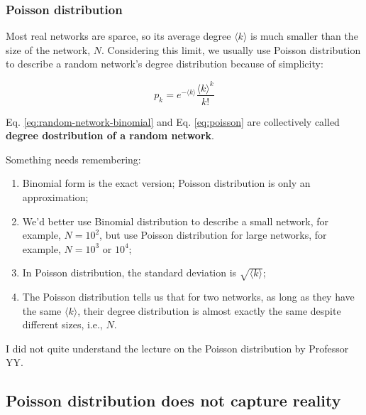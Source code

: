 \documentclass[
]{krantz}
\makeatletter
\newenvironment{kframe}{%
\medskip{}
\setlength{\fboxsep}{.8em}
 \def\at@end@of@kframe{}%
 \ifinner\ifhmode%
  \def\at@end@of@kframe{\end{minipage}}%
  \begin{minipage}{\columnwidth}%
 \fi\fi%
 \def\FrameCommand##1{\hskip\@totalleftmargin \hskip-\fboxsep
 \colorbox{shadecolor}{##1}\hskip-\fboxsep
     \hskip-\linewidth \hskip-\@totalleftmargin \hskip\columnwidth}%
 \MakeFramed {\advance\hsize-\width
   \@totalleftmargin\z@ \linewidth\hsize
   \@setminipage}}%
 {\par\unskip\endMakeFramed%
 \at@end@of@kframe}
\newenvironment{rmdblock}[1]
  {
  \begin{itemize}
  \renewcommand{\labelitemi}{
    \raisebox{-.7\height}[0pt][0pt]{
      {\setkeys{Gin}{width=3em,keepaspectratio}\texttt{[image: images/\#1]}}
    }
  }
  \setlength{\fboxsep}{1em}
  \begin{kframe}
  \item
  }
  {
  \end{kframe}
  \end{itemize}
  }
\newenvironment{rmdreminder}
  {\begin{rmdblock}{reminder}}
  {\end{rmdblock}}
\makeatother
\begin{document}
\hypertarget{poisson-distribution}{%
\subsubsection{Poisson distribution}\label{poisson-distribution}}

Most real networks are sparce, so its average degree \(\langle k \rangle\) is much smaller than the size of the network, \(N\). Considering this limit, we usually use Poisson distribution to describe a random network's degree distribution because of simplicity:

\begin{equation}
  p_k = e^{-\langle k \rangle}\frac{\langle k \rangle^k}{k!} \label{eq:poisson}
\end{equation}

Eq. \eqref{eq:random-network-binomial} and Eq. \eqref{eq:poisson} are collectively called \textbf{degree dostribution of a random network}.

Something needs remembering:

\begin{enumerate}
\def\labelenumi{\arabic{enumi}.}
\item
  Binomial form is the exact version; Poisson distribution is only an approximation;
\item
  We'd better use Binomial distribution to describe a small network, for example, \(N = 10^2\), but use Poisson distribution for large networks, for example, \(N = 10^3\) or \(10^4\);
\item
  In Poisson distribution, the standard deviation is \(\sqrt {\langle k \rangle}\);
\item
  The Poisson distribution tells us that for two networks, as long as they have the same \(\langle k \rangle\), their degree distribution is almost exactly the same despite different sizes, i.e., \(N\).
\end{enumerate}

\begin{rmdreminder}
I did not quite understand the lecture on the Poisson distribution by Professor YY.\\
\end{rmdreminder}

\hypertarget{poisson-distribution-does-not-capture-reality}{%
\subsection{Poisson distribution does not capture reality}\label{poisson-distribution-does-not-capture-reality}}
\end{document}
